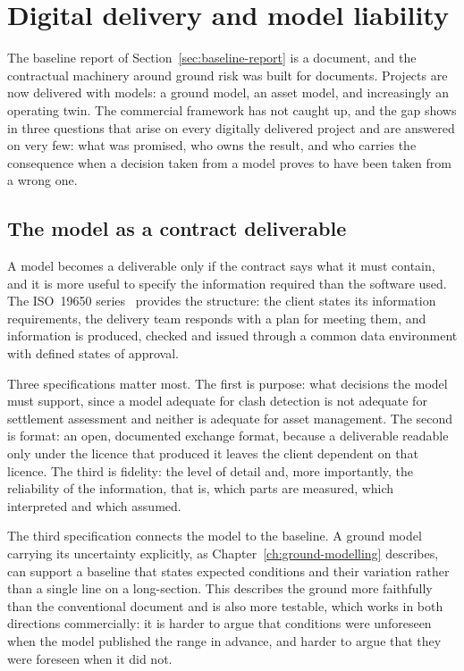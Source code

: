 \section{Digital delivery and model liability}
\label{sec:digital-delivery}

The baseline report of Section~\ref{sec:baseline-report} is a document, and the contractual
machinery around ground risk was built for documents. Projects are now
delivered with models: a ground model, an asset model, and increasingly an
operating twin. The commercial framework has not caught up, and the gap shows
in three questions that arise on every digitally delivered project and are
answered on very few: what was promised, who owns the result, and who
carries the consequence when a decision taken from a model proves to have
been taken from a wrong one.

\subsection{The model as a contract deliverable}
\label{sec:model-deliverable}

A model becomes a deliverable only if the contract says what it must contain,
and it is more useful to specify the information required than
the software used. The ISO~19650 series~\citep{iso19650} provides the
structure: the client states its information requirements, the delivery team
responds with a plan for meeting them, and information is produced,
checked and issued through a common data environment with defined states of
approval.

Three specifications matter most. The first is purpose: what decisions the
model must support, since a model adequate for clash detection is not adequate
for settlement assessment and neither is adequate for asset management.
The second is format: an open, documented exchange format, because a deliverable readable
only under the licence that produced it leaves the client dependent on that licence.
The third is fidelity: the level of detail and, more importantly, the
reliability of the information, that is, which parts are measured, which
interpreted and which assumed.

The third specification connects the model to the baseline. A ground model
carrying its uncertainty explicitly, as
Chapter~\ref{ch:ground-modelling} describes, can support a baseline that
states expected conditions and their variation rather than a single line on a
long-section. This describes the ground more faithfully than the conventional
document and is also more testable, which works in both directions
commercially: it is harder to argue
that conditions were unforeseen when the model published the range in advance,
and harder to argue that they were foreseen when it did not.

